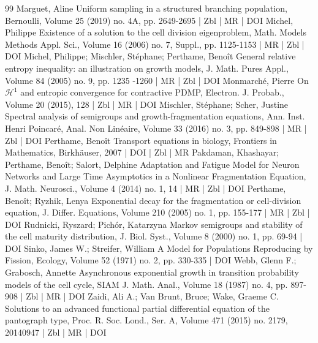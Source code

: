 \begin{thebibliography}{99}
Marguet, Aline Uniform sampling in a structured branching population, Bernoulli, Volume 25 (2019) no. 4A, pp. 2649-2695 | Zbl | MR | DOI
Michel, Philippe Existence of a solution to the cell division eigenproblem, Math. Models Methods Appl. Sci., Volume 16 (2006) no. 7, Suppl., pp. 1125-1153 | MR | Zbl | DOI
Michel, Philippe; Mischler, Stéphane; Perthame, Benoît General relative entropy inequality: an illustration on growth models, J. Math. Pures Appl., Volume 84 (2005) no. 9, pp. 1235 -1260 | MR | Zbl | DOI
Monmarché, Pierre On $\mathcal{H}^1$ and entropic convergence for contractive PDMP, Electron. J. Probab., Volume 20 (2015), 128 | Zbl | MR | DOI
Mischler, Stéphane; Scher, Justine Spectral analysis of semigroups and growth-fragmentation equations, Ann. Inst. Henri Poincaré, Anal. Non Linéaire, Volume 33 (2016) no. 3, pp. 849-898 | MR | Zbl | DOI
Perthame, Benoît Transport equations in biology, Frontiers in Mathematics, Birkhäuser, 2007 | DOI | Zbl | MR
Pakdaman, Khashayar; Perthame, Benoît; Salort, Delphine Adaptation and Fatigue Model for Neuron Networks and Large Time Asymptotics in a Nonlinear Fragmentation Equation, J. Math. Neurosci., Volume 4 (2014) no. 1, 14 | MR | Zbl | DOI
Perthame, Benoît; Ryzhik, Lenya Exponential decay for the fragmentation or cell-division equation, J. Differ. Equations, Volume 210 (2005) no. 1, pp. 155-177 | MR | Zbl | DOI
Rudnicki, Ryszard; Pichór, Katarzyna Markov semigroups and stability of the cell maturity distribution, J. Biol. Syst., Volume 8 (2000) no. 1, pp. 69-94 | DOI
Sinko, James W.; Streifer, William A Model for Populations Reproducing by Fission, Ecology, Volume 52 (1971) no. 2, pp. 330-335 | DOI
Webb, Glenn F.; Grabosch, Annette Asynchronous exponential growth in transition probability models of the cell cycle, SIAM J. Math. Anal., Volume 18 (1987) no. 4, pp. 897-908 | Zbl | MR | DOI
Zaidi, Ali A.; Van Brunt, Bruce; Wake, Graeme C. Solutions to an advanced functional partial differential equation of the pantograph type, Proc. R. Soc. Lond., Ser. A, Volume 471 (2015) no. 2179, 20140947 | Zbl | MR | DOI
\end{thebibliography}
